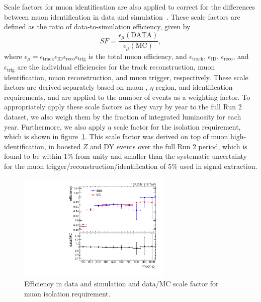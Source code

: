 Scale factors for muon identification are also applied to correct for the differences between muon identification in data and simulation~\cite{Sirunyan_2020,MuonPAGs}.
These scale factors are defined as the ratio of data-to-simulation efficiency, given by
\begin{equation}
  SF=\frac{\epsilon_\mu(\mathrm{DATA})}{\epsilon_\mu(\mathrm{MC})},
\end{equation}
where $\epsilon_\mu=\epsilon_\mathrm{track}\epsilon_\mathrm{ID}\epsilon_\mathrm{reco}\epsilon_\mathrm{trig}$ is the total muon efficiency, and $\epsilon_\mathrm{track}$, $\epsilon_\mathrm{ID}$, $\epsilon_\mathrm{reco}$, and $\epsilon_\mathrm{trig}$ are the individual efficiencies for the track reconstruction, muon identification, muon reconstruction, and muon trigger, respectively.
These scale factors are derived separately based on muon \pt, $\eta$ region, and identification requirements, and are applied to the number of events as a weighting factor.
To appropriately apply these scale factors as they vary by year to the full Run 2 dataset, we also weigh them by the fraction of integrated luminosity for each year.
Furthermore, we also apply a scale factor for the isolation requirement, which is shown in figure~\ref{fig:muonIsoSF}.
This scale factor was derived on top of muon high-\pt identification, in boosted $Z$ and DY events over the full Run 2 period, which is found to be within 1\% from unity and smaller than the systematic uncertainty for the muon trigger/reconstruction/identification of 5\% used in signal extraction.

\begin{figure}[htbp]
  \centering
  \includegraphics[width=0.65\textwidth]{fig/eventSelection/muonFullIsoSF.pdf}
  \caption{
    Efficiency in data and simulation and data/MC scale factor for muon isolation requirement.
  }
  \label{fig:muonIsoSF}
\end{figure}

